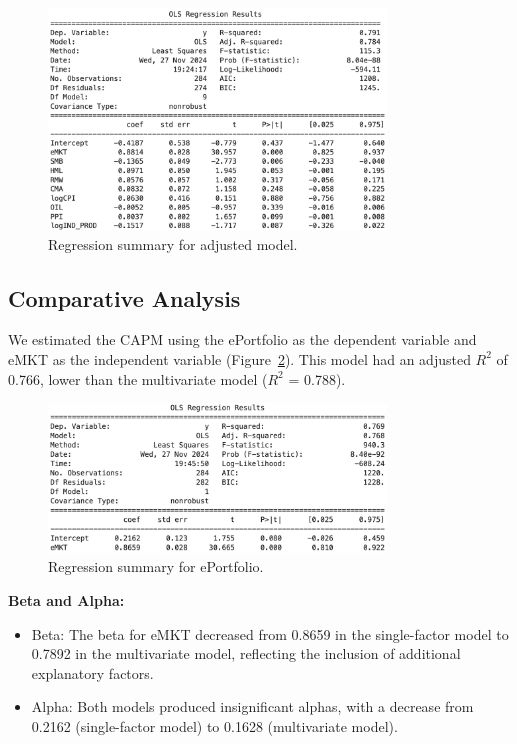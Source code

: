 \begin{figure}[h!]
    \centering
    \includegraphics[width=0.8\textwidth]{images/7_3.png}
    \caption{Regression summary for adjusted model.}\label{fig:7_3}
\end{figure}

\subsection{Comparative Analysis}

We estimated the CAPM using the ePortfolio as the dependent variable and eMKT as the independent variable
(Figure~\ref{fig:7_4}).
This model had an adjusted $R^2$ of 0.766, lower than the multivariate model ($R^2$ = 0.788).

\begin{figure}[h!]
    \centering
    \includegraphics[width=0.8\textwidth]{images/7_4.png}
    \caption{Regression summary for ePortfolio.}\label{fig:7_4}
\end{figure}

\textbf{Beta and Alpha:}
\begin{itemize}
    \item Beta: The beta for eMKT decreased from 0.8659 in the single-factor model to 0.7892 in the multivariate model,
    reflecting the inclusion of additional explanatory factors.
    \item Alpha: Both models produced insignificant alphas, with a decrease from 0.2162 (single-factor model) to 0.1628
    (multivariate model).

\end{itemize}

